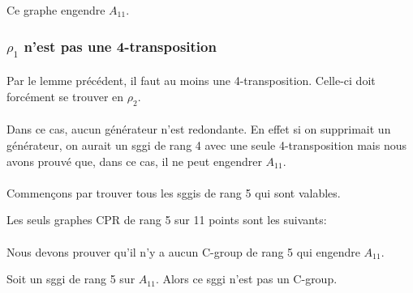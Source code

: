\begin{lemma}
  Ce graphe engendre $A_{11}$.
\end{lemma}

\subsubsection{$\rho_1$ n'est pas une 4-transposition}

\paragraph{}
Par le lemme précédent, il faut au moins une 4-transposition. Celle-ci doit forcément se trouver en $\rho_2$.

\paragraph{}
Dans ce cas, aucun générateur n'est redondante. En effet si on supprimait un générateur, on aurait un sggi de rang 4 avec une seule 4-transposition mais nous avons prouvé que, dans ce cas, il ne peut engendrer $A_11$.

\paragraph{}
Commençons par trouver tous les sggis de rang 5 qui sont valables.

\begin{theorem}
  Les seuls graphes CPR de rang 5 sur 11 points sont les suivants:

\end{theorem}

\paragraph{}
Nous devons prouver qu'il n'y a aucun C-group de rang 5 qui engendre $A_{11}$.

\begin{theorem}
  Soit un sggi de rang 5 sur $A_{11}$. Alors ce sggi n'est pas un C-group.
\end{theorem}

